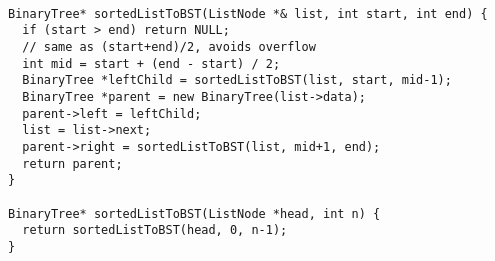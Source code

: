 \begin{verbatim}

BinaryTree* sortedListToBST(ListNode *& list, int start, int end) {
  if (start > end) return NULL;
  // same as (start+end)/2, avoids overflow
  int mid = start + (end - start) / 2;
  BinaryTree *leftChild = sortedListToBST(list, start, mid-1);
  BinaryTree *parent = new BinaryTree(list->data);
  parent->left = leftChild;
  list = list->next;
  parent->right = sortedListToBST(list, mid+1, end);
  return parent;
}
 
BinaryTree* sortedListToBST(ListNode *head, int n) {
  return sortedListToBST(head, 0, n-1);
}
\end{verbatim}
